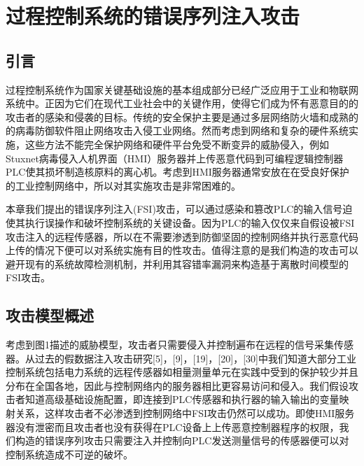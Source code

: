 
\chapter{过程控制系统的错误序列注入攻击}
\label{chap:FSIattack}

\section{引言}
\label{sec:intro}

过程控制系统作为国家关键基础设施的基本组成部分已经广泛应用于工业和物联网系统中。正因为它们在现代工业社会中的关键作用，使得它们成为怀有恶意目的的攻击者的感染和侵袭的目标。传统的安全保护主要是通过多层网络防火墙和成熟的的病毒防御软件阻止网络攻击入侵工业网络。然而考虑到网络和复杂的硬件系统实施，这些方法不能完全保护网络和硬件平台免受不断变异的威胁侵入，例如Stuxnet病毒侵入人机界面（HMI）服务器并上传恶意代码到可编程逻辑控制器PLC使其损坏制造核原料的离心机。考虑到HMI服务器通常安放在在受良好保护的工业控制网络中，所以对其实施攻击是非常困难的。

本章我们提出的错误序列注入(FSI)攻击，可以通过感染和篡改PLC的输入信号迫使其执行误操作和破坏控制系统的关键设备。因为PLC的输入仅仅来自假设被FSI攻击注入的远程传感器，所以在不需要渗透到防御坚固的控制网络并执行恶意代码上传的情况下便可以对系统实施有目的性攻击。值得注意的是我们构造的攻击可以避开现有的系统故障检测机制，并利用其容错率漏洞来构造基于离散时间模型的FSI攻击。

\section{攻击模型概述}
\label{sec:formulation}

考虑到图1描述的威胁模型，攻击者只需要侵入并控制遍布在远程的信号采集传感器。从过去的假数据注入攻击研究[5]，[9]，[19]，[20]，[30]中我们知道大部分工业控制系统包括电力系统的远程传感器如相量测量单元在实践中受到的保护较少并且分布在全国各地，因此与控制网络内的服务器相比更容易访问和侵入。我们假设攻击者知道高级基础设施配置，即连接到PLC传感器和执行器的输入输出的变量映射关系，这样攻击者不必渗透到控制网络中FSI攻击仍然可以成功。即使HMI服务器没有泄密而且攻击者也没有获得在PLC设备上上传恶意控制器程序的权限，我们构造的错误序列攻击只需要注入并控制向PLC发送测量信号的传感器便可以对控制系统造成不可逆的破坏。

